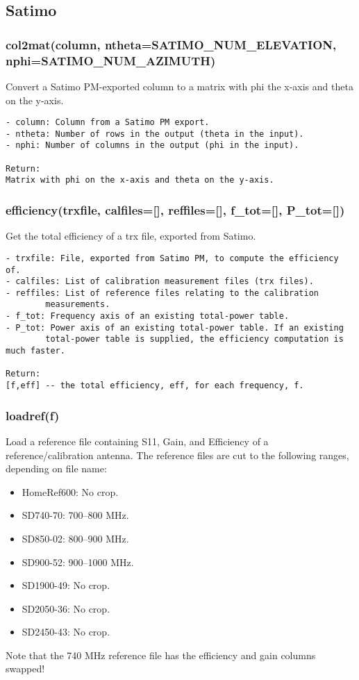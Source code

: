 \subsection{Satimo}
\subsubsection{col2mat(column, ntheta=SATIMO\_NUM\_ELEVATION, nphi=SATIMO\_NUM\_AZIMUTH)}
Convert a Satimo PM-exported column to a matrix with phi the 
x-axis and theta on the y-axis.

\begin{verbatim}
- column: Column from a Satimo PM export.
- ntheta: Number of rows in the output (theta in the input).
- nphi: Number of columns in the output (phi in the input).

Return:
Matrix with phi on the x-axis and theta on the y-axis.
\end{verbatim}

\subsubsection{efficiency(trxfile, calfiles=[], reffiles=[], f\_tot=[], P\_tot=[])}
Get the total efficiency of a trx file, exported from Satimo.

\begin{verbatim}
- trxfile: File, exported from Satimo PM, to compute the efficiency of.
- calfiles: List of calibration measurement files (trx files).
- reffiles: List of reference files relating to the calibration
        measurements.
- f_tot: Frequency axis of an existing total-power table.
- P_tot: Power axis of an existing total-power table. If an existing
        total-power table is supplied, the efficiency computation is much faster.

Return:
[f,eff] -- the total efficiency, eff, for each frequency, f.
\end{verbatim}

\subsubsection{loadref(f)}
Load a reference file containing S11, Gain, and Efficiency of a
reference/calibration antenna.
The reference files are cut to the following ranges, depending on file name:
\begin{itemize}
\item HomeRef600: No crop.
\item SD740-70: 700--800 MHz.
\item SD850-02: 800--900 MHz.
\item SD900-52: 900--1000 MHz.
\item SD1900-49: No crop.
\item SD2050-36: No crop.
\item SD2450-43: No crop.
\end{itemize}
Note that the 740 MHz reference file has the efficiency and gain columns
swapped!

